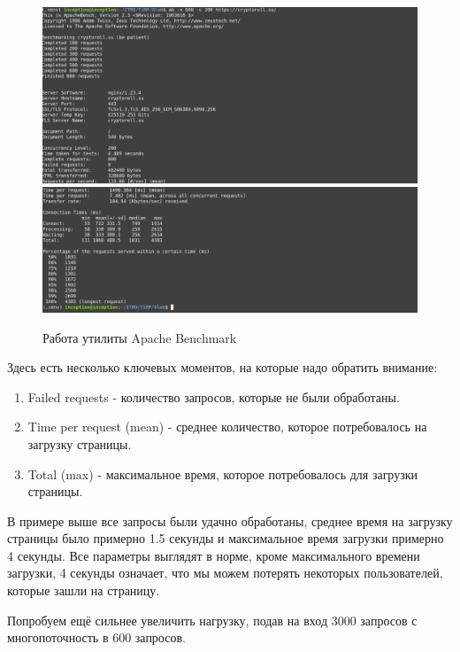 \documentclass[a4paper, 12pt]{article}
\begin{document}
\newpage
\begin{figure}[h!]
    \noindent
    \centering
    \includegraphics[width=1\linewidth]{pic_ab_1.png}
    \includegraphics[width=1\linewidth]{pic_ab_2.png}
    \caption{Работа утилиты Apache Benchmark}
\end{figure}

Здесь есть несколько ключевых моментов, на которые надо обратить внимание:
\begin{enumerate}
    \item Failed requests - количество запросов, которые не были обработаны.
    \item Time per request (mean) - среднее количество, которое потребовалось на загрузку страницы.
    \item Total (max) - максимальное время, которое потребовалось для загрузки страницы.
\end{enumerate}

В примере выше все запросы были удачно обработаны, среднее время на загрузку страницы было примерно 1.5 секунды и максимальное время загрузки примерно 4 секунды. Все параметры выглядят в норме, кроме максимального времени загрузки, 4 секунды означает, что мы можем потерять некоторых пользователей, которые зашли на страницу.

Попробуем ещё сильнее увеличить нагрузку, подав на вход 3000 запросов с многопоточность в 600 запросов.
\end{document}
